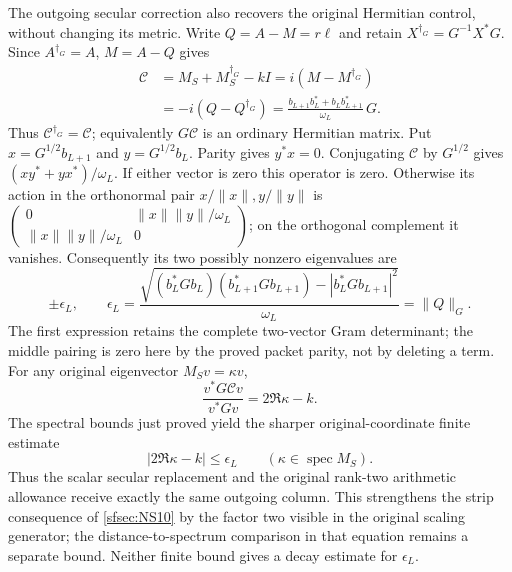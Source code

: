 The outgoing secular correction also recovers the
original Hermitian control, without changing its
metric. Write $Q=A-M=r\ell$ and retain
$X^{\dagger_G}=G^{-1}X^*G$. Since $A^{\dagger_G}=A$,
$M=A-Q$ gives
\begin{equation}\tag{NS35}\label{sfsec:NS35}
\begin{split}
\mathcal C
&=M_S+M_S^{\dagger_G}-kI
=i(M-M^{\dagger_G})\\
&=-i(Q-Q^{\dagger_G})
=\frac{b_{L+1}b_L^*+b_Lb_{L+1}^*}{\omega_L}\,G .
\end{split}
\end{equation}
Thus $\mathcal C^{\dagger_G}=\mathcal C$; equivalently
$G\mathcal C$ is an ordinary Hermitian matrix.
Put $x=G^{1/2}b_{L+1}$ and $y=G^{1/2}b_L$.
Parity gives $y^*x=0$. Conjugating $\mathcal C$ by
$G^{1/2}$ gives $(xy^*+yx^*)/\omega_L$.
If either vector is zero this operator is zero.
Otherwise its action in the orthonormal pair
$x/\|x\|,y/\|y\|$ is
$\left(\begin{smallmatrix}0&\|x\|\|y\|/\omega_L\\
\|x\|\|y\|/\omega_L&0\end{smallmatrix}\right)$;
on the orthogonal complement it vanishes. Consequently
its two possibly nonzero eigenvalues are
\begin{equation}\tag{NS36}\label{sfsec:NS36}
\pm\epsilon_L,\qquad
\epsilon_L=
\frac{\sqrt{(b_L^*Gb_L)(b_{L+1}^*Gb_{L+1})
                 -|b_L^*Gb_{L+1}|^2}}{\omega_L}
=\|Q\|_G .
\end{equation}
The first expression retains the complete two-vector
Gram determinant; the middle pairing is zero here
by the proved packet parity, not by deleting a term.
For any original eigenvector $M_Sv=\kappa v$,
\[
\frac{v^*G\mathcal C v}{v^*Gv}=2\Re\kappa-k.
\]
The spectral bounds just proved yield the sharper
original-coordinate finite estimate
\begin{equation}\tag{NS37}\label{sfsec:NS37}
|2\Re\kappa-k|\leq\epsilon_L
\qquad(\kappa\in\operatorname{spec}M_S).
\end{equation}
Thus the scalar secular replacement and the original
rank-two arithmetic allowance receive exactly the
same outgoing column. This strengthens the strip
consequence of \eqref{sfsec:NS10} by the factor two
visible in the original scaling generator; the
distance-to-spectrum comparison in that equation
remains a separate bound. Neither
finite bound gives a decay estimate for $\epsilon_L$.

